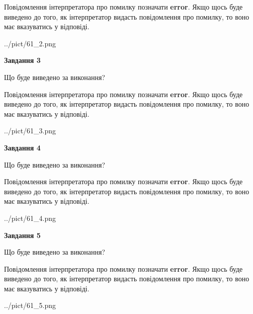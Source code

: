 \documentclass[12pt, ukrainian]{article}
\begin{document}
{\begin {large}
Повідомлення інтерпретатора про помилку позначати \textbf{error}.
Якщо щось буде виведено до того, як інтерпретатор видасть повідомлення про помилку, 
то воно має вказуватись у відповіді. \par


\begin{center}
	{../pict/61_2.png}
\end{center}
\newpage

{\begin {center}\textbf{Завдання 3}\end {center}}\par
Що буде виведено за виконання?

Повідомлення інтерпретатора про помилку позначати \textbf{error}.
Якщо щось буде виведено до того, як інтерпретатор видасть повідомлення про помилку, 
то воно має вказуватись у відповіді. \par


\begin{center}
	{../pict/61_3.png}
\end{center}
\newpage

{\begin {center}\textbf{Завдання 4}\end {center}}\par
Що буде виведено за виконання?

Повідомлення інтерпретатора про помилку позначати \textbf{error}.
Якщо щось буде виведено до того, як інтерпретатор видасть повідомлення про помилку, 
то воно має вказуватись у відповіді. \par


\begin{center}
	{../pict/61_4.png}
\end{center}
\newpage

{\begin {center}\textbf{Завдання 5}\end {center}}\par
Що буде виведено за виконання?

Повідомлення інтерпретатора про помилку позначати \textbf{error}.
Якщо щось буде виведено до того, як інтерпретатор видасть повідомлення про помилку, 
то воно має вказуватись у відповіді. \par


\begin{center}
	{../pict/61_5.png}
\end{center}
\newpage


\end{large}}
\end{document}
